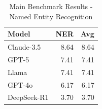 \begin{table}[htbp]
\centering
\caption{Main Benchmark Results - Named Entity Recognition}
\label{tab:ner_main_results}
\begin{tabular}{lrr}
\toprule
Model & NER & \textbf{Avg} \\
\midrule
Claude-3.5 & 8.64 & 8.64 \\
GPT-5 & 7.41 & 7.41 \\
Llama & 7.41 & 7.41 \\
GPT-4o & 6.17 & 6.17 \\
DeepSeek-R1 & 3.70 & 3.70 \\
\bottomrule
\end{tabular}
\end{table}
